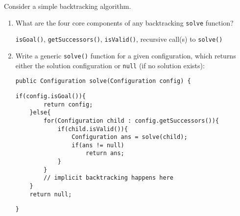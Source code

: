 Consider a simple backtracking algorithm.

\begin{enumerate}
\item What are the four core components of any backtracking \texttt{solve} function?

\begin{answer}
\texttt{isGoal()}, \texttt{getSuccessors()}, \texttt{isValid()}, recursive call(s) to \texttt{solve()}
\end{answer}

\item Write a generic \texttt{solve()} function for a given configuration, which returns either the solution configuration or \texttt{null} (if no solution exists):
\vspace{.25in}
\begin{lstlisting}[numbers=none]
public Configuration solve(Configuration config) {
\end{lstlisting}
\begin{answer}
\begin{lstlisting}[numbers=none]
	if(config.isGoal()){
		return config;
	}else{
		for(Configuration child : config.getSuccessors()){
			if(child.isValid()){
				Configuration ans = solve(child);
				if(ans != null)
					return ans;
			}
		}
		// implicit backtracking happens here
	}
	return null;
\end{lstlisting}
\end{answer}
\begin{lstlisting}[numbers=none]
}
\end{lstlisting}
\end{enumerate}